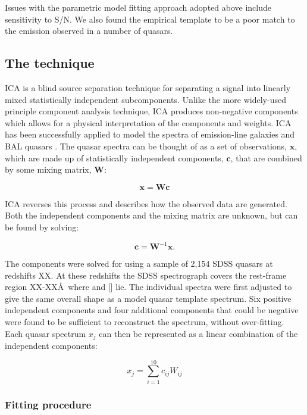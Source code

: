 Issues with the parametric model fitting approach adopted above include sensitivity to S/N. 
We also found the empirical template to be a poor match to the  emission observed in a number of quasars. 

\subsection{The technique}
 
ICA is a blind source separation technique for separating a signal into linearly mixed statistically independent subcomponents. 
Unlike the more widely-used principle component analysis technique, ICA produces non-negative components which allows for a physical interpretation of the components and weights.  
ICA has been successfully applied to model the spectra of emission-line galaxies \citep{allen13} and BAL quasars \citep{allen11}. 
The quasar spectra can be thought of as a set of observations, $\bm{x}$, which are made up of statistically independent components, $\bm{c}$, that are combined by some mixing matrix, $\bm{W}$:

\begin{equation}
    \bm{x} = \bm{W}\bm{c}
\end{equation}

ICA reverses this process and describes how the observed data are generated. 
Both the independent components and the mixing matrix are unknown, but can be found by solving:

\begin{equation}
    \bm{c} = \bm{W}^{-1}\bm{x}.
\end{equation}

The components were solved for using a sample of 2,154 SDSS quasars at redshifts XX. 
At these redshifts the SDSS spectrograph covers the rest-frame region XX-XX\AA\, where \hb and [] lie. 
The individual spectra were first adjusted to give the same overall shape as a model quasar template spectrum.
Six positive independent components and four additional components that could be negative were found to be sufficient to reconstruct the spectrum, without over-fitting. 
Each quasar spectrum $x_j$ can then be represented as a linear combination of the independent components: 

\begin{equation}
    x_j = \sum_{i=1}^{10} c_{ij}W_{ij}
\end{equation}

\subsubsection{Fitting procedure}

